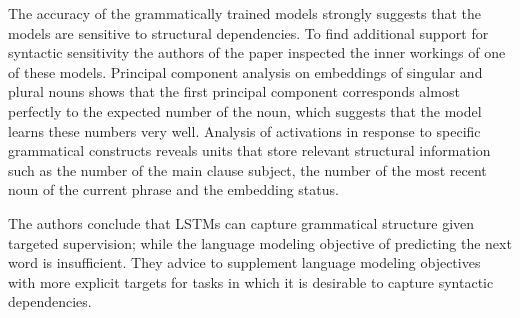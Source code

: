 The accuracy of the grammatically trained models strongly suggests
that the models are sensitive to structural dependencies. To
find additional support for syntactic sensitivity the authors
of the paper inspected the inner workings of one of these models.
Principal component analysis on embeddings of singular and plural nouns
shows that the first principal component
corresponds almost perfectly to the expected number of the noun,
which suggests that the model learns these numbers very well.
Analysis of activations in response to specific grammatical
constructs reveals units that store relevant structural
information such as the number of the main clause subject,
the number of the most recent noun of the current phrase
and the embedding status. 


The authors conclude that LSTMs can capture grammatical structure given targeted supervision; while the language modeling objective of predicting the next word is insufficient. They advice to supplement language modeling objectives with more explicit targets for tasks in which it is desirable to capture syntactic dependencies.
